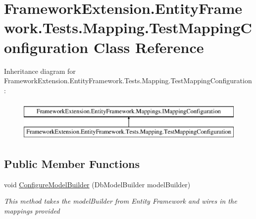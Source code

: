\hypertarget{class_framework_extension_1_1_entity_framework_1_1_tests_1_1_mapping_1_1_test_mapping_configuration}{\section{Framework\-Extension.\-Entity\-Framework.\-Tests.\-Mapping.\-Test\-Mapping\-Configuration Class Reference}
\label{class_framework_extension_1_1_entity_framework_1_1_tests_1_1_mapping_1_1_test_mapping_configuration}
}
Inheritance diagram for Framework\-Extension.\-Entity\-Framework.\-Tests.\-Mapping.\-Test\-Mapping\-Configuration\-:\begin{figure}[H]
\begin{center}
\leavevmode
\includegraphics[height=2.000000cm]{class_framework_extension_1_1_entity_framework_1_1_tests_1_1_mapping_1_1_test_mapping_configuration}
\end{center}
\end{figure}
\subsection*{Public Member Functions}
\begin{DoxyCompactItemize}
\item 
void \hyperlink{class_framework_extension_1_1_entity_framework_1_1_tests_1_1_mapping_1_1_test_mapping_configuration_ab3e0ed1691f37fa30871356ba49f88eb}{Configure\-Model\-Builder} (Db\-Model\-Builder model\-Builder)
\begin{DoxyCompactList}\small\item\em This method takes the model\-Builder from Entity Framework and wires in the mappings provided \end{DoxyCompactList}\end{DoxyCompactItemize}


